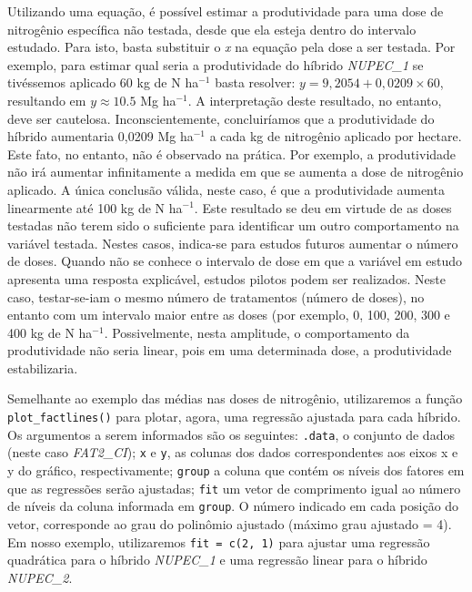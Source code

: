 \documentclass[
]{book}
\makeatletter
\numberwithin{equation}{section}
\newcommand{\indf}[1]{\index[function]{#1@\texttt{#1()}|ST}}
\newcommand{\indt}[1]{\index{#1|ST}}
\makeatother
\begin{document}
Utilizando uma equação, é possível estimar a produtividade para uma dose de nitrogênio específica não testada, desde que ela esteja dentro do intervalo estudado. Para isto, basta substituir o \emph{x} na equação pela dose a ser testada. Por exemplo, para estimar qual seria a produtividade do híbrido \emph{NUPEC\_1} se tivéssemos aplicado 60 kg de N ha\(^{-1}\) basta resolver: \(y = 9,2054 + 0,0209\times 60\), resultando em \(y \approx 10.5\) Mg ha\(^{-1}\). A interpretação deste resultado, no entanto, deve ser cautelosa. Inconscientemente, concluiríamos que a produtividade do híbrido aumentaria 0,0209 Mg ha\(^{-1}\) a cada kg de nitrogênio aplicado por hectare. Este fato, no entanto, não é observado na prática. Por exemplo, a produtividade não irá aumentar infinitamente a medida em que se aumenta a dose de nitrogênio aplicado. A única conclusão válida, neste caso, é que a produtividade aumenta linearmente até 100 kg de N ha\(^{-1}\). Este resultado se deu em virtude de as doses testadas não terem sido o suficiente para identificar um outro comportamento na variável testada. Nestes casos, indica-se para estudos futuros aumentar o número de doses. Quando não se conhece o intervalo de dose em que a variável em estudo apresenta uma resposta explicável, estudos pilotos podem ser realizados. Neste caso, testar-se-iam o mesmo número de tratamentos (número de doses), no entanto com um intervalo maior entre as doses (por exemplo, 0, 100, 200, 300 e 400 kg de N ha\(^{-1}\). Possivelmente, nesta amplitude, o comportamento da produtividade não seria linear, pois em uma determinada dose, a produtividade estabilizaria.

Semelhante ao exemplo das médias nas doses de nitrogênio, utilizaremos a função \texttt{plot\_factlines()} \indf{plot\_factlines} para plotar, agora, uma regressão \indt{regressão} ajustada para cada híbrido. Os argumentos a serem informados são os seguintes: \texttt{.data}, o conjunto de dados (neste caso \emph{FAT2\_CI}); \texttt{x} e \texttt{y}, as colunas dos dados correspondentes aos eixos x e y do gráfico, respectivamente; \texttt{group} a coluna que contém os níveis dos fatores em que as regressões serão ajustadas; \texttt{fit} um vetor de comprimento igual ao número de níveis da coluna informada em \texttt{group}. O número indicado em cada posição do vetor, corresponde ao grau do polinômio ajustado (máximo grau ajustado = 4). Em nosso exemplo, utilizaremos \texttt{fit\ =\ c(2,\ 1)} para ajustar uma regressão quadrática para o híbrido \emph{NUPEC\_1} e uma regressão linear para o híbrido \emph{NUPEC\_2}.
\end{document}
